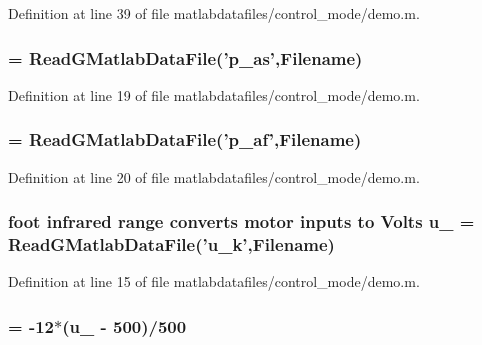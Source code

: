 Definition at line 39 of file matlabdatafiles/control\_\-mode/demo.m.
\subsubsection[{theta\_\-2}]{ = ReadGMatlabDataFile('p\_\-as',{\bf Filename})}\label{matlabdatafiles_2control__mode_2demo_8m_acf332723297849f64a9169282c1237c5}


Definition at line 19 of file matlabdatafiles/control\_\-mode/demo.m.
\subsubsection[{theta\_\-3}]{ = ReadGMatlabDataFile('p\_\-af',{\bf Filename})}\label{matlabdatafiles_2control__mode_2demo_8m_abbb2a4909669066c03b01bec6b92aadc}


Definition at line 20 of file matlabdatafiles/control\_\-mode/demo.m.
\subsubsection[{u\_\-1}]{\setlength{\rightskip}{0pt plus 5cm}foot infrared range converts motor inputs to Volts {\bf u\_} = ReadGMatlabDataFile('{\bf u\_\-k}',{\bf Filename})}\label{matlabdatafiles_2control__mode_2demo_8m_ace7b203e012b8b638d98a1d4ef4a10bb}


Definition at line 15 of file matlabdatafiles/control\_\-mode/demo.m.
\subsubsection[{u\_\-2}]{ = -\/12$\ast$({\bf u\_} -\/ 500)/500}\label{matlabdatafiles_2control__mode_2demo_8m_a3d5b0d701fb4fdc2c6b27abaf5c6b5c8}


